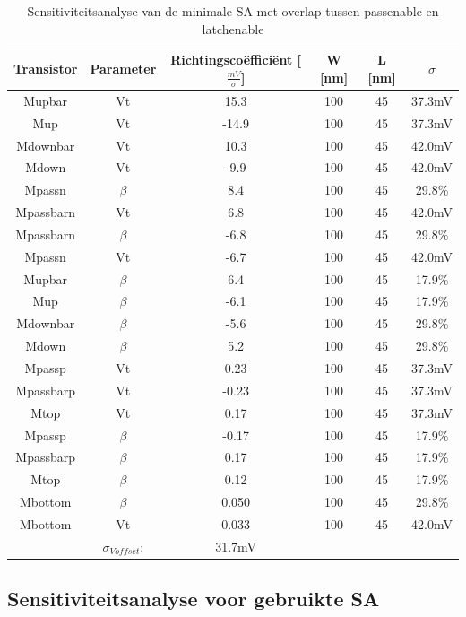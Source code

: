 \begin{table}
\begin{tabular}{cccccc}
\hline 
Transistor & Parameter & Richtingscoëfficiënt [$\frac{mV}{\sigma}$] & W [nm] & L [nm] & $\sigma$ \\ 
\hline 
Mupbar & Vt & 15.3 & 100 & 45 & 37.3mV \\ 
Mup & Vt & -14.9 & 100 & 45 & 37.3mV \\ 
Mdownbar & Vt & 10.3 & 100 & 45 & 42.0mV \\ 
Mdown & Vt & -9.9 & 100 & 45 & 42.0mV \\
Mpassn & $\beta$ & 8.4 & 100 & 45 & 29.8\% \\ 
Mpassbarn & Vt & 6.8 & 100 & 45 & 42.0mV \\
Mpassbarn & $\beta$ & -6.8 & 100 & 45 & 29.8\% \\
Mpassn & Vt & -6.7 & 100 & 45 & 42.0mV \\ 
Mupbar & $\beta$ & 6.4 & 100 & 45 & 17.9\% \\ 
Mup & $\beta$ & -6.1 & 100 & 45 & 17.9\% \\ 
Mdownbar & $\beta$ & -5.6 & 100 & 45 & 29.8\% \\  
Mdown & $\beta$ & 5.2 & 100 & 45 & 29.8\% \\ 
Mpassp & Vt & 0.23 & 100 & 45 & 37.3mV \\
Mpassbarp & Vt & -0.23 & 100 & 45 & 37.3mV \\
Mtop & Vt & 0.17 & 100 & 45 & 37.3mV \\  
Mpassp & $\beta$ & -0.17 & 100 & 45 & 17.9\% \\ 
Mpassbarp & $\beta$ & 0.17 & 100 & 45 & 17.9\% \\ 
Mtop & $\beta$ & 0.12 & 100 & 45 & 17.9\% \\
Mbottom & $\beta$ & 0.050 & 100 & 45 & 29.8\% \\ 
Mbottom & Vt & 0.033 & 100 & 45 & 42.0mV \\ 
\hline 
\hline & $\sigma_{Voffset}$: & 31.7mV & & & \\
\hline
\end{tabular} 
\caption[Sensitiviteitsanalyse van de minimale SA met overlap tussen passenable en latchenable]{Sensitiviteitsanalyse van de minimale SA met overlap tussen passenable en latchenable}
\label{tab:min-sensanalysis-overlap}
\end{table}

\subsection{Sensitiviteitsanalyse voor gebruikte SA}

